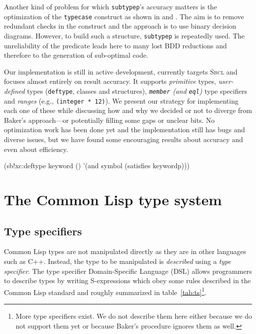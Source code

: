 \documentclass[format=sigconf]{acmart}
\newcommand\code[2][\small]{\sloppy\texttt{#1#2}}
\theoremstyle{definition}
\newcommand\sbcl{\textsc{Sbcl}}
\begin{document}
Another kind of problem for which \code{subtypep}'s accuracy matters is the
optimization of the \code{typecase} construct as shown in \cite{newton.18.phd}
and \cite{newton.18.els}. The aim is to remove redundant checks in the construct
and the approach is to use binary decision diagrams. However, to build such a
structure, \code{subtypep} is repeatedly used. The unreliability of the
predicate leads here to many lost BDD reductions and therefore to the
generation of sub-optimal code.

Our implementation is still in active development, currently targets
\sbcl{} and focuses almost entirely on result accuracy. It supports
\emph{primitive} types, \emph{user-defined} types (\code{deftype}, classes and structures),
\emph{\code{member} (and \code{eql})} type specifiers and \emph{ranges} (e.g.,
\code{(integer * 12)}). We present our strategy for implementing each one
of these while discussing how and why we decided or not to diverge from Baker's
\cite{baker1992}
approach---or potentially filling some gaps or unclear bits.
No optimization work has been done yet and the implementation still has
bugs and diverse issues, but we have found some encouraging results about
accuracy and even about efficiency.

\begin{listing}
  \begin{clcode}
(sb!xc:deftype keyword ()
  '(and symbol (satisfies keywordp)))
  \end{clcode}
  \caption{The \code{keyword} type definition in \sbcl}
  \label{lst:keyword}
\end{listing}


\section{The Common Lisp type system}
\label{sec:cltypes}
\subsection{Type specifiers}
Common Lisp types are not manipulated directly as they are in other languages
such as C++. Instead, the type to be
manipulated is \emph{described} using a \emph{type specifier}.
The type specifier Domain-Specific Language (DSL) allows programmers to
describe types by writing S-expressions which obey some rules described in the
Common Lisp standard \cite{bib:ansi.94.cl} and roughly summarized in
table~\ref{tab:ts}\footnote{More type specifiers exist. We do not describe them
  here either because we do not support them yet or because Baker's procedure
  ignores them as well.}.
\end{document}
